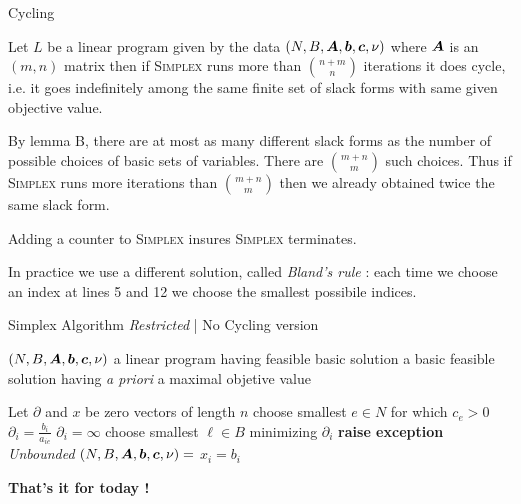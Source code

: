 \documentclass[32pt, aspectratio = 169]{beamer}
\begin{document}
    \begin{frame}{Cycling}
        \begin{prop}[\textbf{C}]
            Let $L$ be a linear program given by the data $(N, B, \boldsymbol{A}, \boldsymbol{b}, \boldsymbol{c}, \nu)$ where $\boldsymbol{A}$ is an $(m, n)$ matrix then if \textsc{Simplex} runs more than $\binom{n+m}{n}$ iterations it does cycle, i.e. it goes indefinitely among the same finite set of slack forms with same given objective value.
        \end{prop}
        \begin{demo}
            By lemma B, there are at most as many different slack forms as the number of possible choices of basic sets of variables. There are $\binom{m+n}{m}$ such choices. Thus if \textsc{Simplex} runs more iterations than $\binom{m+n}{m}$ then we already obtained twice the same slack form.
        \end{demo}
        \begin{rem}
            Adding a counter to \textsc{Simplex} insures \textsc{Simplex} terminates.
        \end{rem}
            In practice we use a different solution, called \emph{Bland's rule} : each time we choose an index at lines 5 and 12 we choose the smallest possibile indices.
    \end{frame}

    \begin{frame}{Simplex Algorithm \textit{Restricted} | No Cycling version}
        \small{
      \begin{algorithmic}[1]
       \Require $(N, B, \boldsymbol{A}, \boldsymbol{b}, \boldsymbol{c}, \nu)$ a linear program \alert{having feasible basic solution}
       \Ensure a basic feasible solution having \textit{a priori} a maximal objetive value
       \begin{multicols}{2}
       \State Let $\partial$ and $x$ be zero vectors of length $n$
            \State choose smallest $e \in N$ for which $c_e > 0$
                    \State $\partial_i = \frac{b_i}{a_{ie}}$
                \Else
                    \State $\partial_i = \infty$
                \EndIf
            \EndFor
            \State choose smallest $\ell \in B$ minimizing $\partial_i$
            \If{$\partial_\ell = \infty$}
                \State \textbf{raise exception} \textit{Unbounded}
            \Else
                \State $(N, B, \boldsymbol{A}, \boldsymbol{b}, \boldsymbol{c}, \nu) =$ 
            \EndIf
        \EndWhile
                \State $x_i = b_i$
            \EndIf
        \EndFor
        \State {}
    \EndFunction
    \end{multicols}
     \end{algorithmic}
     }
    \end{frame}

    \begin{frame}
        \centering
        {\huge \textbf{That's it for today !}}

    \end{frame}
\end{document}
